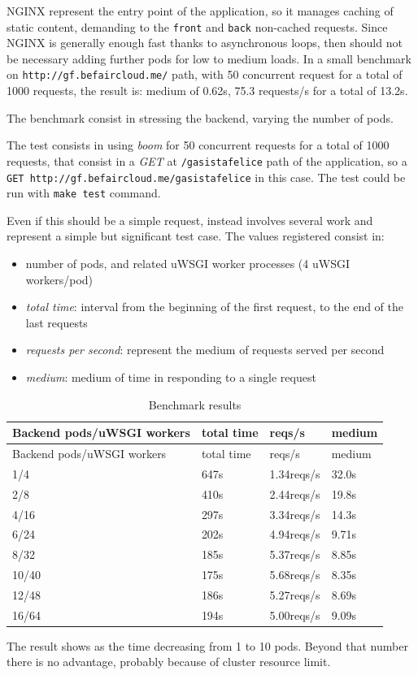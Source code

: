 NGINX  represent the entry point of the application, so it manages caching of static content, demanding to the \texttt{front} and \texttt{back} non-cached requests. Since NGINX is generally enough fast thanks to asynchronous loops, then should not be necessary adding further pods for low to medium loads.  In a small benchmark on \texttt{http://gf.befaircloud.me/} path, with 50 concurrent request for a total of 1000 requests, the result is:  medium of 0.62s, 75.3 requests/s for a total of 13.2s.

The benchmark consist in stressing the backend, varying the number of pods.

The test consists in using \textit{boom} for 50 concurrent requests for a total of 1000 requests, that consist in a \emph{GET} at \texttt{/gasistafelice} path of the application, so a \texttt{GET\ http://gf.befaircloud.me/gasistafelice} in this case.  The test could be run with \texttt{make test} command.

Even if this should be a simple request, instead involves several work and represent a simple but significant test case. The values registered consist in:

\begin{itemize}
\item number of pods, and related uWSGI worker processes (4 uWSGI workers/pod)
\item \textit{total time}: interval from the beginning of the first request,   to the end of the last requests
\item \textit{requests per second}: represent the medium of requests served per second
\item \textit{medium}: medium of time in responding to a single request
\end{itemize}

\begin{longtable}[c]{@{}llll@{}}
\caption{Benchmark results}\tabularnewline
\toprule
Backend pods/uWSGI workers & total time & reqs/s & medium \tabularnewline
\midrule
\endfirsthead
\toprule
Backend pods/uWSGI workers & total time & reqs/s & medium \tabularnewline
\midrule
\endhead
1/4 & 647s & 1.34reqs/s & 32.0s \tabularnewline
2/8 & 410s & 2.44reqs/s & 19.8s \tabularnewline
4/16 & 297s & 3.34reqs/s & 14.3s \tabularnewline
6/24 & 202s & 4.94reqs/s & 9.71s \tabularnewline
8/32 & 185s & 5.37reqs/s & 8.85s \tabularnewline
10/40 & 175s & 5.68reqs/s & 8.35s \tabularnewline
12/48 & 186s & 5.27reqs/s & 8.69s \tabularnewline
16/64 & 194s & 5.00reqs/s & 9.09s \tabularnewline
\bottomrule
\end{longtable}

The result shows as the time decreasing from 1 to 10 pods. Beyond that number there is no advantage, probably because of cluster resource limit.